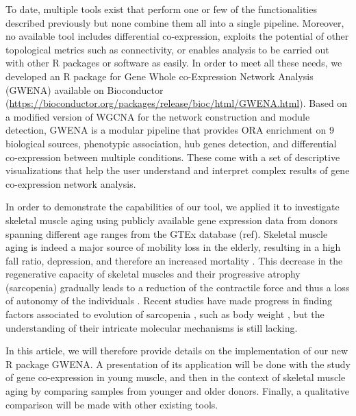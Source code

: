 To date, multiple tools exist that perform one or few of the functionalities described previously but none combine them all into a single pipeline. Moreover, no available tool includes differential co-expression, exploits the potential of other topological metrics such as connectivity, or enables analysis to be carried out with other R packages or software as easily. In order to meet all these needs, we developed an R package for Gene Whole co-Expression Network Analysis (GWENA) available on Bioconductor (\url{https://bioconductor.org/packages/release/bioc/html/GWENA.html}). Based on a modified version of WGCNA for the network construction and module detection, GWENA is a modular pipeline that provides ORA enrichment on 9 biological sources, phenotypic association, hub genes detection, and differential co-expression between multiple conditions. These come with a set of descriptive visualizations that help the user understand and interpret complex results of gene co-expression network analysis.

In order to demonstrate the capabilities of our tool, we applied it to investigate skeletal muscle aging using publicly available gene expression data from donors spanning different age ranges from the GTEx database (ref). Skeletal muscle aging is indeed a major source of mobility loss in the elderly, resulting in a high fall ratio, depression, and therefore an increased mortality . This decrease in the regenerative capacity of skeletal muscles and their progressive atrophy (sarcopenia)  gradually leads to a reduction of the contractile force and thus a loss of autonomy of the individuals . Recent studies have made progress in finding factors associated to evolution of sarcopenia , such as body weight , but the understanding of their intricate molecular mechanisms is still lacking.

In this article, we will therefore provide details on the implementation of our new R package GWENA. A presentation of its application will be done with the study of gene co-expression in young muscle, and then in the context of skeletal muscle aging by comparing samples from younger and older donors.  Finally, a qualitative comparison will be made with other existing tools.



